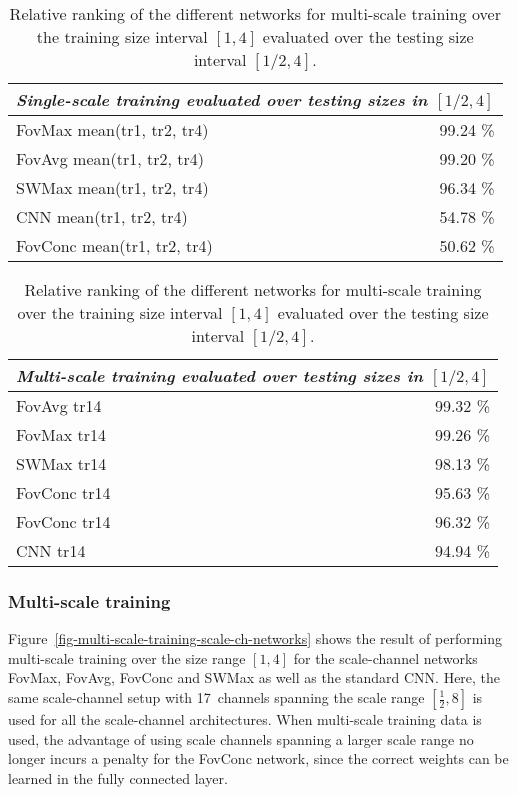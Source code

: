 \documentclass[twocolumn,runningheads]{svjour3}
\begin{document}
\begin{table}[hbtp]
  \begin{tabular}{lr}
  \hline
  \multicolumn{2}{c}{\em Single-scale training evaluated over testing sizes in $[1/2, 4]$} \\
    \hline
    FovMax mean(tr1, tr2, tr4) & 99.24 \% \\
    FovAvg mean(tr1, tr2, tr4) & 99.20 \% \\
    SWMax mean(tr1, tr2, tr4) & 96.34 \% \\
    CNN mean(tr1, tr2, tr4)  & 54.78 \% \\
    FovConc mean(tr1, tr2, tr4) & 50.62 \% \\
    \hline
    \end{tabular}
 \caption{Relative ranking of the different networks for single-scale
   training at either of the training sizes 1, 2 or~4 evaluated over the testing size interval $[1/2, 4]$.}
 \label{tab-benchmark-single-scale-training-1/2-4}

 \bigskip
 \bigskip
 
  \begin{tabular}{lr}
  \hline
  \multicolumn{2}{c}{\em Multi-scale training evaluated over testing sizes in $[1/2, 4]$} \\
    \hline
    FovAvg tr14 & 99.32 \% \\
    FovMax tr14 & 99.26 \% \\
    SWMax tr14 & 98.13 \% \\
    FovConc tr14 & 95.63 \% \\
    FovConc tr14 & 96.32 \% \\
    CNN tr14 & 94.94 \% \\
    \hline
    \end{tabular}
 \caption{Relative ranking of the different networks for multi-scale
   training over the training size interval $[1, 4]$ evaluated over the testing size interval $[1/2, 4]$.}
  \label{tab-benchmark-multi-scale-training-1/2-4}
\end{table}

\subsubsection{Multi-scale training}

Figure~\ref{fig-multi-scale-training-scale-ch-networks} shows the
result of performing multi-scale training over the size range $[1, 4]$
for the scale-channel networks FovMax, FovAvg, FovConc and SWMax as well as the standard CNN.
Here, the same scale-channel setup with 17~channels
spanning the scale range $[\frac{1}{2}, 8]$ is used for all the scale-channel
architectures. When multi-scale training data is used, the advantage of using scale channels spanning a larger scale range no longer incurs a penalty for the FovConc network, since the correct weights can be learned in the fully connected layer. 
\end{document}
